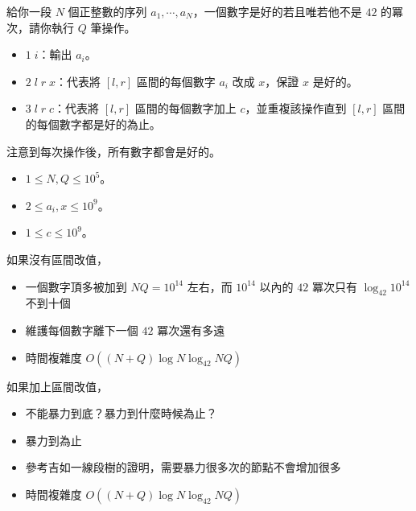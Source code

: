 \begin{frame}{}
    \begin{problem}
        給你一段 $N$ 個正整數的序列 $a_1,\cdots,a_N$，一個數字是好的若且唯若他不是 $42$ 的冪次，請你執行 $Q$ 筆操作。

        \begin{itemize}
            \item $1\;i$：輸出 $a_i$。
            \item $2\;l\;r\;x$：代表將 $[l,r]$ 區間的每個數字 $a_i$ 改成 $x$，保證 $x$ 是好的。
            \item $3\;l\;r\;c$：代表將 $[l,r]$ 區間的每個數字加上 $c$，並重複該操作直到 $[l,r]$ 區間的每個數字都是好的為止。
        \end{itemize}

        注意到每次操作後，所有數字都會是好的。

        \begin{itemize}
            \item $1\le N,Q\le 10^5$。
            \item $2\le a_i,x\le 10^9$。
            \item $1\le c\le 10^9$。
        \end{itemize}
    \end{problem}
\end{frame}

\begin{frame}{}
    如果沒有區間改值，
    
    \begin{itemize}
        \item 一個數字頂多被加到 $NQ = 10^{14}$ 左右，而 $10^{14}$ 以內的 $42$ 冪次只有 $\log_{42} 10^{14}$ 不到十個
        \item 維護每個數字離下一個 $42$ 冪次還有多遠
        \item 時間複雜度 $O((N + Q) \log N \log_{42} NQ)$
    \end{itemize}
\end{frame}

\begin{frame}{}
    如果加上區間改值，

     {
        \begin{itemize}
            \item 不能暴力到底？暴力到什麼時候為止？
        \end{itemize}
    }
    
     {
        \begin{itemize}
            \item 暴力到為止
            \item 參考吉如一線段樹的證明，需要暴力很多次的節點不會增加很多
            \item 時間複雜度 $O((N + Q) \log N \log_{42} NQ)$
        \end{itemize}
    }
\end{frame}

